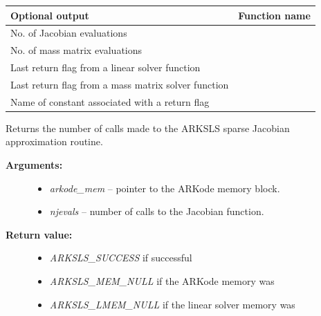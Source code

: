 \documentclass[letterpaper,10pt,english]{sphinxmanual}
\begin{document}
\begin{tabulary}{\linewidth}{|L|L|}
\hline
\textbf{
Optional output
} & \textbf{
Function name
}\\\hline

No. of Jacobian evaluations
 & 
{\hyperref[c_interface/User_callable:ARKSlsGetNumJacEvals]{}}
\\\hline

No. of mass matrix evaluations
 & 
{\hyperref[c_interface/User_callable:ARKSlsGetNumMassEvals]{}}
\\\hline

Last return flag from a linear solver function
 & 
{\hyperref[c_interface/User_callable:ARKSlsGetLastFlag]{}}
\\\hline

Last return flag from a mass matrix solver function
 & 
{\hyperref[c_interface/User_callable:ARKSlsGetLastMassFlag]{}}
\\\hline

Name of constant associated with a return flag
 & 
{\hyperref[c_interface/User_callable:ARKSlsGetReturnFlagName]{}}
\\\hline
\end{tabulary}


\begin{fulllineitems}
\label{c_interface/User_callable:ARKSlsGetNumJacEvals}
Returns the number of calls made to the ARKSLS
sparse Jacobian approximation routine.
\begin{description}
\item[{\textbf{Arguments:}}] \leavevmode\begin{itemize}
\item {} 
\emph{arkode\_mem} -- pointer to the ARKode memory block.

\item {} 
\emph{njevals} -- number of calls to the Jacobian function.

\end{itemize}

\item[{\textbf{Return value:}}] \leavevmode\begin{itemize}
\item {} 
\emph{ARKSLS\_SUCCESS} if successful

\item {} 
\emph{ARKSLS\_MEM\_NULL} if the ARKode memory was 

\item {} 
\emph{ARKSLS\_LMEM\_NULL} if the linear solver memory was 

\end{itemize}

\end{description}

\end{fulllineitems}
\end{document}
